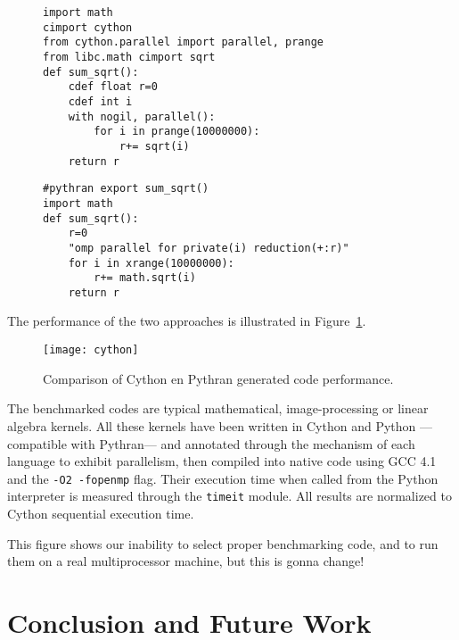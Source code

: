 \documentclass{llncs}
\begin{document}
\begin{figure}[ht]

    \begin{lstlisting}[label={lst:cython-sample}, caption={Cython Impelmentation
    of a Parallel Reduction.}]
import math
cimport cython
from cython.parallel import parallel, prange
from libc.math cimport sqrt
def sum_sqrt():
    cdef float r=0
    cdef int i
    with nogil, parallel():
        for i in prange(10000000):
            r+= sqrt(i)
    return r
\end{lstlisting}
\end{figure}
%
\begin{figure}[ht]
    \begin{lstlisting}[label={lst:pythran-sample}, caption={Cython Impelmentation
    of a Parallel Reduction.}]
#pythran export sum_sqrt()
import math
def sum_sqrt():
    r=0
    "omp parallel for private(i) reduction(+:r)"
    for i in xrange(10000000):
        r+= math.sqrt(i)
    return r
    \end{lstlisting}
\end{figure}



The performance of the two approaches is illustrated in
Figure~\ref{fig:cython-pythran}.

\begin{figure}[ht]
    \texttt{[image: cython]}
    \caption{Comparison of Cython en Pythran generated code performance.}
    \label{fig:cython-pythran}
\end{figure}

The benchmarked codes are typical mathematical, image-processing or linear
algebra kernels. All these kernels have been written in Cython and Python
---compatible with Pythran--- and annotated through the mechanism of each
language to exhibit parallelism, then compiled into native code using GCC 4.1
and the \texttt{-O2 -fopenmp} flag. Their execution time when called from the
Python interpreter is measured through the \texttt{timeit} module. All results
are normalized to Cython sequential execution time.

This figure shows our inability to select proper benchmarking code, and to run
them on a real multiprocessor machine, but this is gonna change!~


\section{Conclusion and Future Work}
\end{document}
